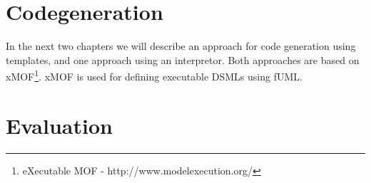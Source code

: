 \documentclass{llncs}
\begin{document}



\section{Codegeneration}
In the next two chapters we will describe an approach for code generation using templates, and one approach using an interpretor. Both approaches are based on xMOF\footnote{ eXecutable MOF - http://www.modelexecution.org/}. xMOF is used for defining executable DSMLs using fUML.





\section{Evaluation}
\end{document}
